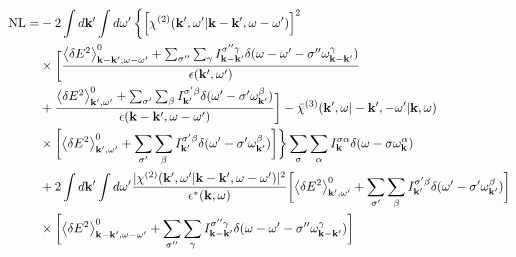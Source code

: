 \documentclass[10pt,aspectratio=1610,lualatex]{beamer}
\begin{document}
\begin{frame}
  \vspace{-0.6cm}
  \begin{displaymath}
    \begin{split}
      \mbox{NL}
      =&-2\int d{\bf k'} \int d\omega '\,\biggl\{
      \left[\chi^{(2)}({\bf k'},\omega '|{\bf k - k'},
	\omega-\omega ')\right]^2\\
      &\times\biggl[\frac{\left< \delta E^2 \right>_{{\bf k-k'},\omega-\omega '}^0
	+\sum_{\sigma ''}\sum_{\gamma} I_{\bf k -k'}^{\sigma '' \gamma}
	\delta(\omega-\omega ' -\sigma '' \omega_{\bf k -k'}^\gamma)}
      {\epsilon({\bf k'},\omega ')}\\
      &+\frac{\left< \delta E^2 \right>_{{\bf k'},\omega '}^0
	+\sum_{\sigma '}\sum_{\beta}
	I_{\bf k'}^{\sigma ' \beta}\delta(\omega '-\sigma ' \omega_{\bf k'}^\beta)}
      {\epsilon({\bf k-k'},\omega-\omega ')}\biggr]
      -\bar \chi^{(3)}({\bf k'},\omega|-{\bf k'},-\omega '|{\bf k},\omega)\\
      &\times\biggl[ \left< \delta E^2 \right>_{{\bf k'},\omega '}^0
      +\sum_{\sigma '}\sum_{\beta}I_{\bf k'}^{\sigma ' \beta}
      \delta(\omega '-\sigma ' \omega_{\bf k'}^\beta) \biggr]\biggr\}
      \sum_{\sigma}\sum_{\alpha}
      I_{\bf k}^{\sigma \alpha}\delta(\omega-\sigma \omega_{\bf k}^\alpha)\\
      &+2\int d{\bf k'} \int d\omega '
      \frac{|\chi^{(2)}({\bf k'},\omega '|{\bf k-k'},\omega-\omega ')|^2}
      {\epsilon^*({\bf k},\omega)}\biggl[
      \left< \delta E^2 \right>_{{\bf k'},\omega '}^0
      +\sum_{\sigma '}\sum_{\beta}I_{\bf k'}^{\sigma ' \beta}
      \delta(\omega '-\sigma ' \omega_{\bf k'}^\beta) \biggr]\\
      &\times \biggl[ \left< \delta E^2 \right>_{{\bf k - k'},\omega-\omega '}^0
      +\sum_{\sigma ''}\sum_{\gamma} I_{\bf k -k'}^{\sigma '' \gamma}
      \delta(\omega-\omega ' -\sigma '' \omega_{\bf k -k'}^\gamma) \biggr]
    \end{split}
  \end{displaymath}
\end{frame}
\end{document}
